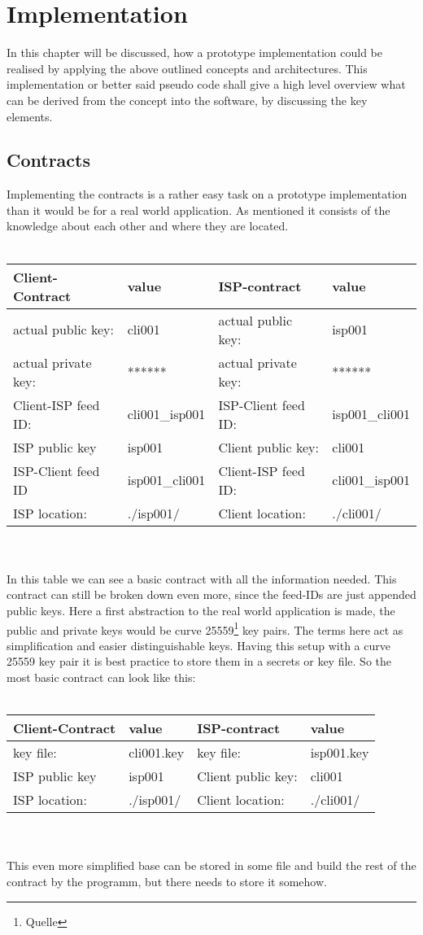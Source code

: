 \chapter{Implementation}
In this chapter will be discussed, how a prototype implementation could be realised by applying the above outlined concepts and architectures. This implementation or better said pseudo code shall give a high level overview what can be derived from the concept into the software, by discussing the key elements.
\section{Contracts}
Implementing the contracts is a rather easy task on a prototype implementation than it would be for a real world application. As mentioned it consists of the knowledge about each other and where they are located. 
\\\\
\begin{tabular}{llll} \toprule
    Client-Contract&value&ISP-contract&value\\ \midrule
    actual public key:& cli001 &  actual public key: &isp001  \\ 
    actual private key:& ****** & actual private key:& ****** \\
    Client-ISP feed ID:& cli001\_isp001 &ISP-Client feed ID:&isp001\_cli001 \\ 
    ISP public key&isp001&Client public key:&cli001\\
    ISP-Client feed ID&isp001\_cli001&Client-ISP feed ID:&cli001\_isp001\\
    ISP location:&.\slash isp001\slash &Client location:& .\slash cli001\slash \\\bottomrule
\end{tabular}
\\
\\
In this table we can see a basic contract with all the information needed. This contract can still be broken down even more, since the feed-IDs are just appended public keys. Here a first abstraction to the real world application is made, the public and private keys would be curve 25559\footnote{Quelle} key pairs. The terms here act as simplification and easier distinguishable keys. Having this setup with a curve 25559 key pair it is best practice to store them in a secrets or key file. So the most basic contract can look like this:
\\\\
\begin{tabular}{llll} \toprule
    Client-Contract&value&ISP-contract&value\\ \midrule
    key file:& cli001.key &  key file: &isp001.key  \\ 
    ISP public key&isp001&Client public key:&cli001\\
    ISP location:&.\slash isp001\slash &Client location:& .\slash cli001\slash \\\bottomrule
\end{tabular}
\\\\
This even more simplified base can be stored in some file and build the rest of the contract by the programm, but there needs to store it somehow.

